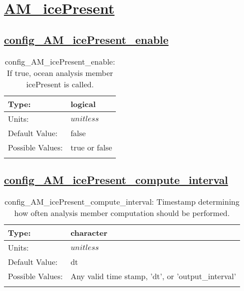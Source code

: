 \section[AM\_icePresent]{\hyperref[sec:nm_tab_AM_icePresent]{AM\_icePresent}}
\label{sec:nm_sec_AM_icePresent}
\subsection[config\_AM\_icePresent\_enable]{\hyperref[sec:nm_tab_AM_icePresent]{config\_AM\_icePresent\_enable}}
\label{subsec:nm_sec_config_AM_icePresent_enable}
\begin{center}
\begin{longtable}{| p{2.0in} || p{4.0in} |}
    \hline
    Type: & logical \\
    \hline
    Units: & $unitless$ \\
    \hline
    Default Value: & false \\
    \hline
    Possible Values: & true or false \\
    \hline
    \caption{config\_AM\_icePresent\_enable: If true, ocean analysis member icePresent is called.}
\end{longtable}
\end{center}
\subsection[config\_AM\_icePresent\_compute\_interval]{\hyperref[sec:nm_tab_AM_icePresent]{config\_AM\_icePresent\_compute\_interval}}
\label{subsec:nm_sec_config_AM_icePresent_compute_interval}
\begin{center}
\begin{longtable}{| p{2.0in} || p{4.0in} |}
    \hline
    Type: & character \\
    \hline
    Units: & $unitless$ \\
    \hline
    Default Value: & dt \\
    \hline
    Possible Values: & Any valid time stamp, 'dt', or 'output\_interval' \\
    \hline
    \caption{config\_AM\_icePresent\_compute\_interval: Timestamp determining how often analysis member computation should be performed.}
\end{longtable}
\end{center}
